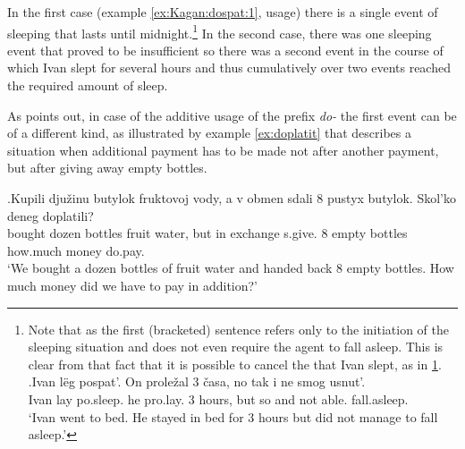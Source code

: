 In the first case (example \ref{ex:Kagan:dospat:1},  usage) there is a single event of sleeping that lasts until midnight.\footnote{Note that as the first (bracketed) sentence refers only to the initiation of the sleeping situation and does not even require the agent to fall asleep. This is clear from that fact that it is possible to cancel the  that Ivan slept, as in \ref{ex:dospat:no}.
\exg.\label{ex:dospat:no}Ivan l\"{e}g pospat'. On prole\v{z}al 3 \v{c}asa, no tak i ne smog usnut'.\\
Ivan lay po.sleep. he pro.lay. 3 hours, but so and not able. fall.asleep.\\
\trans `Ivan went to bed. He stayed in bed for 3 hours but did not manage to fall asleep.'

} In the second case, there was one sleeping event that proved to be insufficient so there was a second event in the course of which Ivan slept for several hours and thus cumulatively over two events reached the required amount of sleep. 

As \citet[80]{Kagan:book} points out, in case of the additive usage of the prefix \textit{do-} the first event can be of a different kind, as illustrated by example \ref{ex:doplatit} that describes a situation when additional payment has to be made not after another payment, but after giving away empty bottles.

\exg.\label{ex:doplatit}Kupili dju\v{z}inu butylok fruktovoj vody, a v obmen sdali 8 pustyx butylok. Skol'ko deneg doplatili?\\
bought dozen bottles fruit water, but in exchange s.give. 8 empty bottles how.much money do.pay.\\
\trans `We bought a dozen bottles of fruit water and handed back 8 empty bottles. How much money did we have to pay in addition?'


